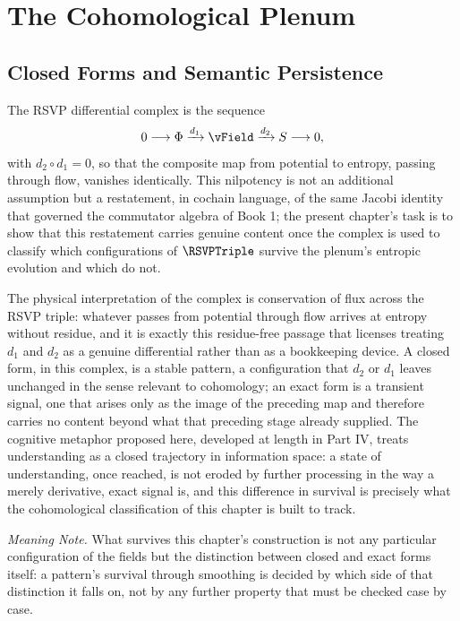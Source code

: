\part{The Cohomological Plenum}

\chapter{Closed Forms and Semantic Persistence}

The RSVP differential complex is the sequence
\[
0 \longrightarrow \PhiField \xrightarrow{d_1} \vField \xrightarrow{d_2} \SEntropy \longrightarrow 0,
\]
with $d_2 \circ d_1 = 0$, so that the composite map from potential to entropy, passing through flow, vanishes identically. This nilpotency is not an additional assumption but a restatement, in cochain language, of the same Jacobi identity that governed the commutator algebra of Book 1; the present chapter's task is to show that this restatement carries genuine content once the complex is used to classify which configurations of $\RSVPTriple$ survive the plenum's entropic evolution and which do not.

The physical interpretation of the complex is conservation of flux across the RSVP triple: whatever passes from potential through flow arrives at entropy without residue, and it is exactly this residue-free passage that licenses treating $d_1$ and $d_2$ as a genuine differential rather than as a bookkeeping device. A closed form, in this complex, is a stable pattern, a configuration that $d_2$ or $d_1$ leaves unchanged in the sense relevant to cohomology; an exact form is a transient signal, one that arises only as the image of the preceding map and therefore carries no content beyond what that preceding stage already supplied. The cognitive metaphor proposed here, developed at length in Part IV, treats understanding as a closed trajectory in information space: a state of understanding, once reached, is not eroded by further processing in the way a merely derivative, exact signal is, and this difference in survival is precisely what the cohomological classification of this chapter is built to track.

\emph{Meaning Note.} What survives this chapter's construction is not any particular configuration of the fields but the distinction between closed and exact forms itself: a pattern's survival through smoothing is decided by which side of that distinction it falls on, not by any further property that must be checked case by case.


